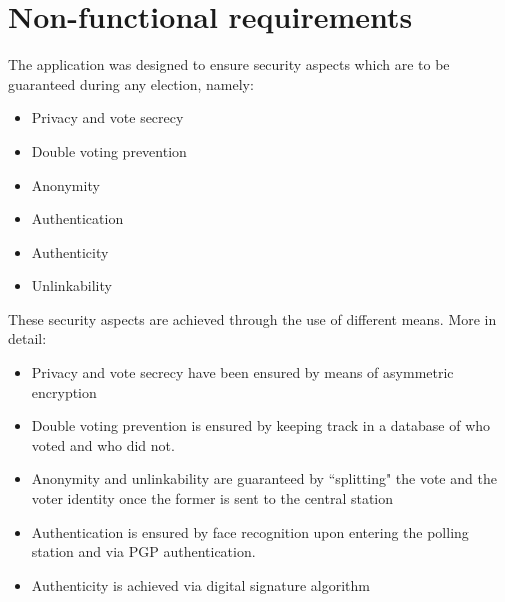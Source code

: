 \section{Non-functional requirements}\label{sec:non_func_req}
The application was designed to ensure security aspects which are to be guaranteed during any election, namely:\\
\begin{itemize}
	\item Privacy and vote secrecy
	\item Double voting prevention
	\item Anonymity
	\item Authentication
	\item Authenticity
	\item Unlinkability
\end{itemize}
\hfill \break
\noindent These security aspects are achieved through the use of different means. More in detail:\\
\begin{itemize}
	\item Privacy and vote secrecy have been ensured by means of asymmetric encryption
	\item Double voting prevention is ensured by keeping track in a database of who voted and who did not.
	\item Anonymity and unlinkability are guaranteed by ``splitting" the vote and the voter identity once the former is sent to the central station
	\item Authentication is ensured by face recognition upon entering the polling station and via PGP authentication.
	\item Authenticity is achieved via digital signature algorithm
\end{itemize}